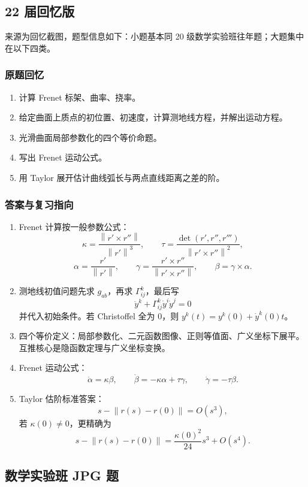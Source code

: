\documentclass[UTF8,12pt,a4paper]{ctexart}
\newcommand{\norm}[1]{\left\lVert #1\right\rVert}
\begin{document}
\subsection{22 届回忆版}

来源为回忆截图，题型信息如下：小题基本同 20 级数学实验班往年题；大题集中在以下四类。

\subsubsection*{原题回忆}
\begin{enumerate}
\item 计算 Frenet 标架、曲率、挠率。
\item 给定曲面上质点的初位置、初速度，计算测地线方程，并解出运动方程。
\item 光滑曲面局部参数化的四个等价命题。
\item 写出 Frenet 运动公式。
\item 用 Taylor 展开估计曲线弧长与两点直线距离之差的阶。
\end{enumerate}

\subsubsection*{答案与复习指向}
\begin{enumerate}
\item Frenet 计算按一般参数公式：
\[
\kappa=\frac{\norm{r'\times r''}}{\norm{r'}^3},\qquad
\tau=\frac{\det(r',r'',r''')}{\norm{r'\times r''}^2},
\]
\[
\alpha=\frac{r'}{\norm{r'}},\qquad
\gamma=\frac{r'\times r''}{\norm{r'\times r''}},\qquad
\beta=\gamma\times\alpha.
\]
\item 测地线初值问题先求 $g_{ab}$，再求 $\Gamma^k_{ij}$，最后写
\[
\ddot y^k+\Gamma^k_{ij}\dot y^i\dot y^j=0
\]
并代入初始条件。若 Christoffel 全为 $0$，则 $y^k(t)=y^k(0)+\dot y^k(0)t$。
\item 四个等价定义：局部参数化、二元函数图像、正则等值面、广义坐标下展平。互推核心是隐函数定理与广义坐标变换。
\item Frenet 运动公式：
\[
\dot\alpha=\kappa\beta,\qquad
\dot\beta=-\kappa\alpha+\tau\gamma,\qquad
\dot\gamma=-\tau\beta.
\]
\item Taylor 估阶标准答案：
\[
s-\norm{r(s)-r(0)}=O(s^3),
\]
若 $\kappa(0)\ne0$，更精确为
\[
s-\norm{r(s)-r(0)}=\frac{\kappa(0)^2}{24}s^3+O(s^4).
\]
\end{enumerate}

\subsection{数学实验班 JPG 题}
\end{document}
